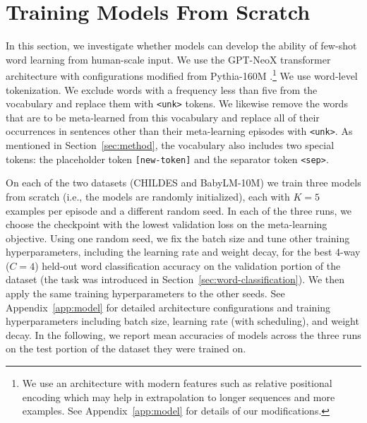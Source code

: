 \documentclass{article}
\begin{document}
\section{Training Models From Scratch}
\label{sec:train-from-scratch}
In this section, we investigate whether models can develop the ability of few-shot word learning from human-scale input.
We use the GPT-NeoX transformer architecture \citep{GPT-NeoX} with configurations modified from Pythia-160M \citep{Pythia}.\footnote{We use an architecture with modern features such as relative positional encoding which may help in extrapolation to longer sequences and more examples. See Appendix~\ref{app:model} for details of our modifications.}
We use word-level tokenization. We exclude words with a frequency less than five from the vocabulary and replace them with \texttt{<unk>} tokens. We likewise remove the words that are to be meta-learned from this vocabulary and replace all of their occurrences in sentences other than their meta-learning episodes with \texttt{<unk>}. As mentioned in Section~\ref{sec:method}, the vocabulary also includes two special tokens: the placeholder token \texttt{[new-token]} and the separator token \texttt{<sep>}.

On each of the two datasets (CHILDES and BabyLM-10M) we train three models from scratch (i.e., the models are randomly initialized), each with $K=5$ examples per episode and a different random seed.
In each of the three runs, we choose the checkpoint with the lowest validation loss on the meta-learning objective.
Using one random seed, we fix the batch size and tune other training hyperparameters, including the learning rate and weight decay, for the best 4-way ($C=4$) held-out word classification accuracy on the validation portion of the dataset (the task was introduced in Section~\ref{sec:word-classification}).
We then apply the same training hyperparameters to the other seeds.
See Appendix~\ref{app:model} for detailed architecture configurations and training hyperparameters including batch size, learning rate (with scheduling), and weight decay.
In the following, we report mean accuracies of models across the three runs on the test portion of the dataset they were trained on.
\end{document}
